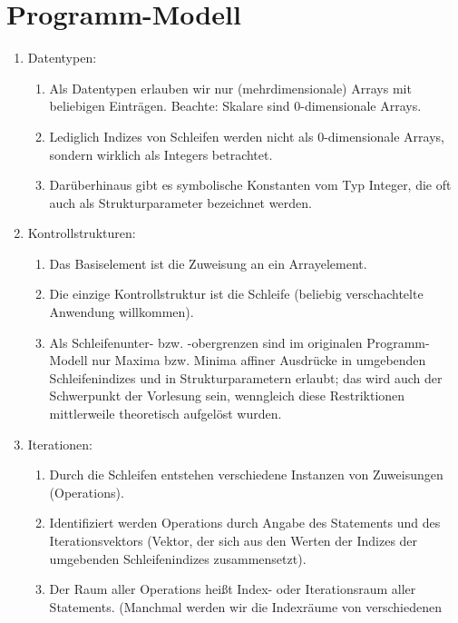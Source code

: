 \section{Programm-Modell}
\label{sec:prog-mod}

\begin{enumerate}
\item Datentypen:
  \begin{enumerate}
  \item Als Datentypen erlauben wir nur (mehrdimensionale) Arrays
    mit beliebigen Einträgen. Beachte: Skalare sind 0-dimensionale
    Arrays.
  \item Lediglich Indizes von Schleifen werden nicht als 0-dimensionale
    Arrays, sondern wirklich als Integers betrachtet.
  \item Darüberhinaus gibt es symbolische Konstanten vom Typ Integer,
    die oft auch als Strukturparameter bezeichnet werden.
  \end{enumerate}
\item Kontrollstrukturen:
  \begin{enumerate}
  \item Das Basiselement ist die Zuweisung an ein Arrayelement.
  \item Die einzige Kontrollstruktur ist die Schleife (beliebig
    verschachtelte Anwendung willkommen).
  \item Als Schleifenunter- bzw. -obergrenzen sind im originalen
    Programm-Modell nur Maxima bzw. Minima affiner Ausdrücke in
    umgebenden Schleifenindizes und in Strukturparametern
    erlaubt; das wird auch der Schwerpunkt der Vorlesung sein,
    wenngleich diese Restriktionen mittlerweile theoretisch aufgelöst
    wurden.
  \end{enumerate}
\item Iterationen:
  \begin{enumerate}
  \item Durch die Schleifen entstehen verschiedene Instanzen von
    Zuweisungen (Operations).
  \item Identifiziert werden Operations durch Angabe des Statements und
    des Iterationsvektors (Vektor, der sich aus den Werten der Indizes der
    umgebenden Schleifenindizes zusammensetzt).
  \item Der Raum aller Operations heißt Index- oder Iterationsraum aller 
    Statements. (Manchmal werden wir die Indexräume von verschiedenen

\end{enumerate}
\end{enumerate}
